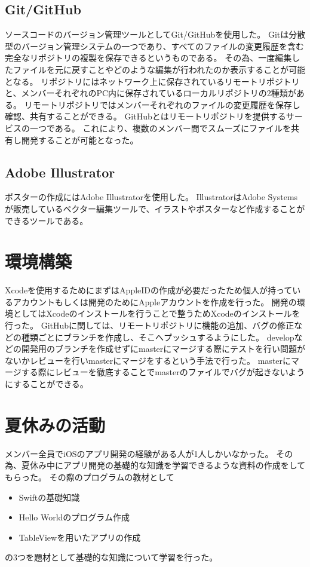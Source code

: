 \documentclass[openany,11pt,papersize]{jsbook}
\begin{document}

\subsection{Git/GitHub}
ソースコードのバージョン管理ツールとしてGit/GitHubを使用した。
Gitは分散型のバージョン管理システムの一つであり、すべてのファイルの変更履歴を含む完全なリポジトリの複製を保存できるというものである。
その為、一度編集したファイルを元に戻すことやどのような編集が行われたのか表示することが可能となる。
リポジトリにはネットワーク上に保存されているリモートリポジトリと、メンバーそれぞれのPC内に保存されているローカルリポジトリの2種類がある。
リモートリポジトリではメンバーそれぞれのファイルの変更履歴を保存し確認、共有することができる。
GitHubとはリモートリポジトリを提供するサービスの一つである。
これにより、複数のメンバー間でスムーズにファイルを共有し開発することが可能となった。


\subsection{Adobe Illustrator}
ポスターの作成にはAdobe Illustratorを使用した。
IllustratorはAdobe Systemsが販売しているベクター編集ツールで、イラストやポスターなど作成することができるツールである。


\section{環境構築}
Xcodeを使用するためにまずはAppleIDの作成が必要だったため個人が持っているアカウントもしくは開発のためにAppleアカウントを作成を行った。
開発の環境としてはXcodeのインストールを行うことで整うためXcodeのインストールを行った。
GitHubに関しては、リモートリポジトリに機能の追加、バグの修正などの種類ごとにブランチを作成し、そこへプッシュするようにした。
developなどの開発用のブランチを作成せずにmasterにマージする際にテストを行い問題がないかレビューを行いmasterにマージをするという手法で行った。
masterにマージする際にレビューを徹底することでmasterのファイルでバグが起きないようにすることができる。


\section{夏休みの活動}
メンバー全員でiOSのアプリ開発の経験がある人が1人しかいなかった。
その為、夏休み中にアプリ開発の基礎的な知識を学習できるような資料の作成をしてもらった。
その際のプログラムの教材として
\begin{itemize}

\item Swiftの基礎知識
\item Hello Worldのプログラム作成
\item TableViewを用いたアプリの作成

\end{itemize}
の3つを題材として基礎的な知識について学習を行った。
\end{document}
